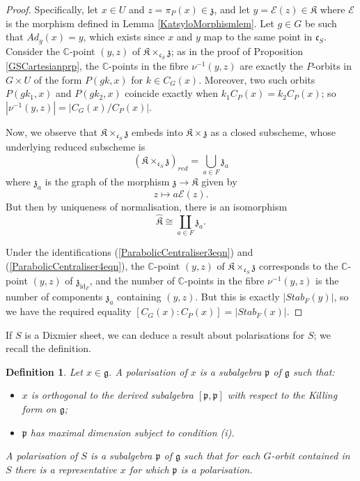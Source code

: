 \documentclass{amsart}
\newtheorem{definition}[theorem]{Definition}
\theoremstyle{remark}
\numberwithin{theorem}{section}
\numberwithin{equation}{section}
\begin{document}
\begin{proof}
Specifically, let $x \in U$ and $z = \pi_P(x) \in \mathfrak{z}$, and let $y = \mathcal E(z) \in \mathfrak{K}$ where $\mathcal E$ is the morphism defined in Lemma \ref{KatsyloMorphismlem}. Let $g \in G$ be such that $Ad_g(x) = y$, which exists since $x$ and $y$ map to the same point in $\mathfrak{c}_S$. Consider the $\mathbb{C}$-point $(y,z)$ of $ \mathfrak{K} \times_{\mathfrak{c}_S} \mathfrak{z}$; as in the proof of Proposition \ref{GSCartesianprp}, the $\mathbb{C}$-points in the fibre $\nu^{-1}(y,z)$ are exactly the $P$-orbits in $G\times U$ of the form $P(gk,x)$ for $k \in C_G(x)$. Moreover, two such orbits $P(gk_1,x)$ and $P(gk_2,x)$ coincide exactly when $k_1C_P(x)=k_2C_P(x)$; so $|\nu^{-1}(y,z)| = |C_G(x)/C_P(x)|$.

Now, we observe that $\mathfrak{K} \times_{\mathfrak{c}_S} \mathfrak{z}$ embeds into $\mathfrak{K} \times \mathfrak{z}$ as a closed subscheme, whose underlying reduced subscheme is
\begin{equation}\label{ParabolicCentraliser3eqn}
    ( \mathfrak{K} \times_{\mathfrak{c}_S} \mathfrak{z})_{red} = \bigcup_{a \in F}\mathfrak{z}_a
\end{equation}
where $\mathfrak{z}_a$ is the graph of the morphism $\mathfrak{z} \rightarrow \mathfrak{K}$ given by
$$z \mapsto a\mathcal E(z).$$
But then by uniqueness of normalisation, there is an isomorphism
\begin{equation}\label{ParabolicCentraliser4eqn}
    \hat{\mathfrak{K}} \cong \coprod_{a \in F} \mathfrak{z}_a.
\end{equation}

Under the identifications (\ref{ParabolicCentraliser3eqn}) and (\ref{ParabolicCentraliser4eqn}), the $\mathbb{C}$-point $(y,z)$ of $\mathfrak{K} \times_{\mathfrak{c}_S} \mathfrak{z}$ corresponds to the $\mathbb{C}$-point $(y,z)$ of $\mathfrak{z}_{\text{id}_F}$, and the number of $\mathbb{C}$-points in the fibre $\nu^{-1}(y,z)$ is the number of components $\mathfrak{z}_a$ containing $(y,z)$. But this is exactly $|Stab_F(y)|$, so we have the required equality $[C_G(x):C_P(x)] = |Stab_F(x)|$.
\end{proof}

If $S$ is a Dixmier sheet, we can deduce a result about polarisations for $S$; we recall the definition.

\begin{definition}\label{Polarisationdef}
    Let $x \in \mathfrak{g}$. A \emph{polarisation of $x$} is a subalgebra $\mathfrak{p}$ of $\mathfrak{g}$ such that:
    \begin{itemize}
        \item[(i)] $x$ is orthogonal to the derived subalgebra $[\mathfrak{p},\mathfrak{p}]$ with respect to the Killing form on $\mathfrak{g}$;
        \item[(ii)] $\mathfrak{p}$ has maximal dimension subject to condition (i).
    \end{itemize}
    A \emph{polarisation of $S$} is a subalgebra $\mathfrak{p}$ of $\mathfrak{g}$ such that for each $G$-orbit contained in $S$ there is a representative $x$ for which $\mathfrak{p}$ is a polarisation.
\end{definition}
\end{document}

